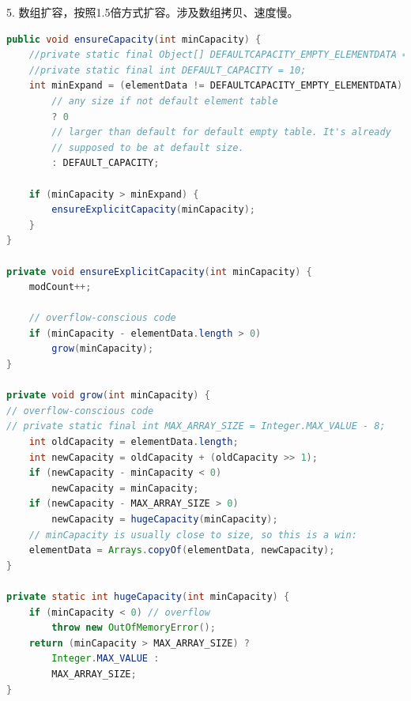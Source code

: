5. 数组扩容，按照1.5倍方式扩容。涉及数组拷贝、速度慢。
\begin{lstlisting}[language=java]
public void ensureCapacity(int minCapacity) {
	//private static final Object[] DEFAULTCAPACITY_EMPTY_ELEMENTDATA = {};
	//private static final int DEFAULT_CAPACITY = 10;
	int minExpand = (elementData != DEFAULTCAPACITY_EMPTY_ELEMENTDATA)
		// any size if not default element table
		? 0
		// larger than default for default empty table. It's already
		// supposed to be at default size.
		: DEFAULT_CAPACITY;
	
	if (minCapacity > minExpand) {
		ensureExplicitCapacity(minCapacity);
	}
}

private void ensureExplicitCapacity(int minCapacity) {
	modCount++;
	
	// overflow-conscious code
	if (minCapacity - elementData.length > 0)
		grow(minCapacity);
}

private void grow(int minCapacity) {
// overflow-conscious code
// private static final int MAX_ARRAY_SIZE = Integer.MAX_VALUE - 8;
	int oldCapacity = elementData.length;
	int newCapacity = oldCapacity + (oldCapacity >> 1);
	if (newCapacity - minCapacity < 0)
		newCapacity = minCapacity;
	if (newCapacity - MAX_ARRAY_SIZE > 0)
		newCapacity = hugeCapacity(minCapacity);
	// minCapacity is usually close to size, so this is a win:
	elementData = Arrays.copyOf(elementData, newCapacity);
}

private static int hugeCapacity(int minCapacity) {
	if (minCapacity < 0) // overflow
		throw new OutOfMemoryError();
	return (minCapacity > MAX_ARRAY_SIZE) ?
		Integer.MAX_VALUE :
		MAX_ARRAY_SIZE;
}
\end{lstlisting}

